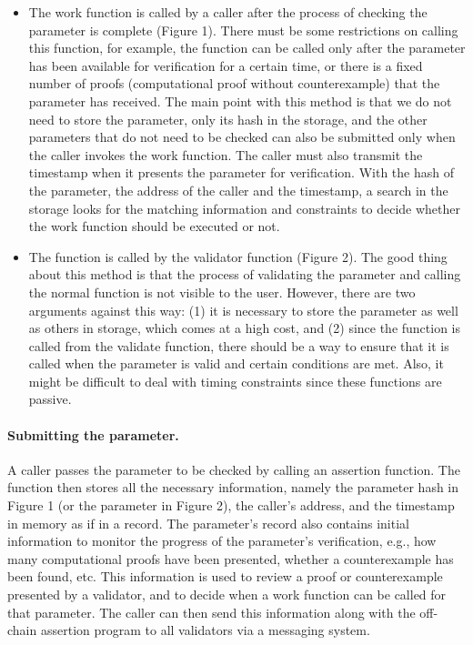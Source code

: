 \documentclass[runningheads]{llncs}
\begin{document}
\begin{itemize}
\item The work function is called by a caller after the process of checking the parameter is complete (Figure 1). There must be some restrictions on calling this function, for example, the function can be called only after the parameter has been available for verification for a certain time, or there is a fixed number of proofs (computational proof without counterexample) that the parameter has received. The main point with this method is that we do not need to store the parameter, only its hash in the storage, and the other parameters that do not need to be checked can also be submitted only when the caller invokes the work function. The caller must also transmit the timestamp when it presents the parameter for verification. With the hash of the parameter, the address of the caller and the timestamp, a search in the storage looks for the matching information and constraints to decide whether the work function should be executed or not.
\item The function is called by the validator function (Figure 2). The good thing about this method is that the process of validating the parameter and calling the normal function is not visible to the user. However, there are two arguments against this way: (1) it is necessary to store the parameter as well as others in storage, which comes at a high cost, and (2) since the function is called from the validate function, there should be a way to ensure that it is called when the parameter is valid and certain conditions are met. Also, it might be difficult to deal with timing constraints since these functions are passive. 
\end{itemize}

\paragraph{Submitting the parameter.} A caller passes the parameter to be checked by calling an assertion function. The function then stores all the necessary information, namely the parameter hash in Figure 1 (or the parameter in Figure 2), the caller's address, and the timestamp in memory as if in a record. The parameter's record also contains initial information to monitor the progress of the parameter's verification, e.g., how many computational proofs have been presented, whether a counterexample has been found, etc. This information is used to review a proof or counterexample presented by a validator, and to decide when a work function can be called for that parameter. The caller can then send this information along with the off-chain assertion program to all validators via a messaging system.
\end{document}
